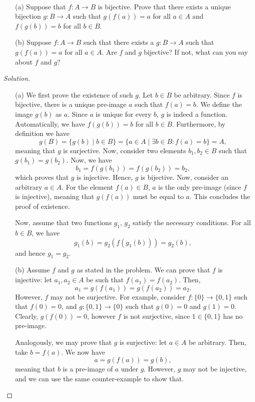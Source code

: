 \begin{problem}~
    \begin{itemize}
        \item[(a)] Suppose that $f \colon A \to B$ is bijective. Prove that there exists a unique bijection $g \colon B \to A$ such that $g(f(a)) = a$ for all $a \in A$ and $f(g(b)) = b$ for all $b \in B$.
        \item[(b)] Suppose $f \colon A \to B$ such that there exists a $g \colon B \to A$ such that $g(f(a)) = a$ for all $a \in A$. Are $f$ and $g$ bijective? If not, what can you say about $f$ and $g$?
    \end{itemize}
\end{problem}
\begin{proof}[Solution]~
    \begin{itemize}
        \item[(a)]
            We first prove the existence of such $g$. Let $b \in B$ be arbitrary. Since $f$ is bijective, there is a unique pre-image $a$ such that $f(a) = b$. We define the image $g(b)$ as $a$. Since $a$ is unique for every $b$, $g$ is indeed a function. Automatically, we have $f(g(b)) = b$ for all $b \in B$. Furthermore, by definition we have
            \[
                g(B) = \{ g(b) \mid b \in B \} = \{ a \in A \mid \exists b \in B: f(a) = b \} = A,
            \]
            meaning that $g$ is surjective. Now, consider two elements $b_1, b_2 \in B$ such that $g(b_1) = g(b_2)$. Now, we have
            \[
                b_1 = f(g(b_1)) = f(g(b_2)) = b_2,
            \]
            which proves that $g$ is injective. Hence, $g$ is bijective. Now, consider an arbitrary $a \in A$. For the element $f(a) \in B$, $a$ is the only pre-image (since $f$ is injective), meaning that $g(f(a))$ must be equal to $a$. This concludes the proof of existence.

            Now, assume that two functions $g_1$, $g_2$ satisfy the necessary conditions. For all $b \in B$, we have
            \[ g_1(b) = g_2(f(g_1(b))) = g_2(b), \]
            and hence $g_1 = g_2$.

        \item[(b)]
            Assume $f$ and $g$ as stated in the problem. We can prove that $f$ is injective: let $a_1, a_2 \in A$ be such that $f(a_1) = f(a_2)$. Then,
            \[ a_1 = g(f(a_1)) = g(f(a_2)) = a_2. \]
            However, $f$ may not be surjective. For example, consider $f \colon \{0\} \to \{0,1\}$ such that $f(0) = 0$, and $g \colon \{0, 1\} \to \{0\}$ such that $g(0) = 0$ and $g(1) = 0$. Clearly, $g(f(0)) = 0$, however $f$ is not surjective, since $1 \in \{0,1\}$ has no pre-image.

            Analogously, we may prove that $g$ is surjective: let $a \in A$ be arbitrary. Then, take $b = f(a)$. We now have
            \[ a = g(f(a)) = g(b), \]
            meaning that $b$ is a pre-image of $a$ under $g$. However, $g$ may not be injective, and we can use the same counter-example to show that.
    \end{itemize}
\end{proof}

